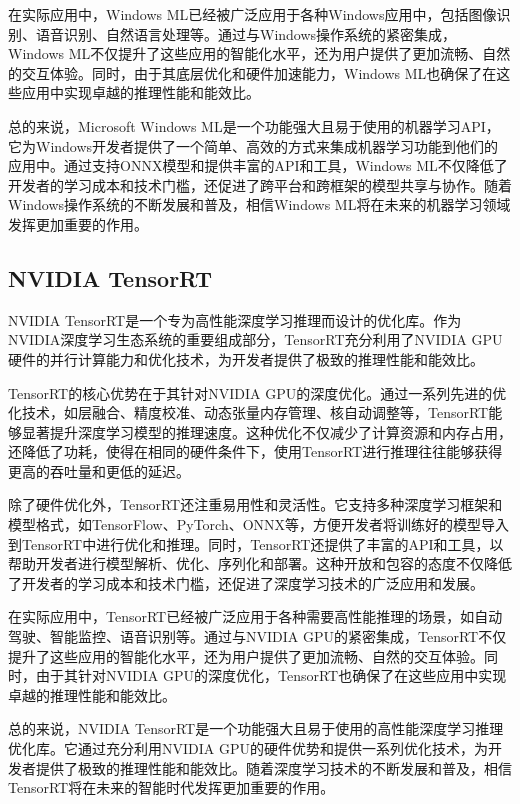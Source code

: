 在实际应用中，Windows ML已经被广泛应用于各种Windows应用中，包括图像识别、语音识别、自然语言处理等。通过与Windows操作系统的紧密集成，Windows ML不仅提升了这些应用的智能化水平，还为用户提供了更加流畅、自然的交互体验。同时，由于其底层优化和硬件加速能力，Windows ML也确保了在这些应用中实现卓越的推理性能和能效比。

总的来说，Microsoft Windows ML是一个功能强大且易于使用的机器学习API，它为Windows开发者提供了一个简单、高效的方式来集成机器学习功能到他们的应用中。通过支持ONNX模型和提供丰富的API和工具，Windows ML不仅降低了开发者的学习成本和技术门槛，还促进了跨平台和跨框架的模型共享与协作。随着Windows操作系统的不断发展和普及，相信Windows ML将在未来的机器学习领域发挥更加重要的作用。

\subsection{NVIDIA TensorRT}

NVIDIA TensorRT是一个专为高性能深度学习推理而设计的优化库。作为NVIDIA深度学习生态系统的重要组成部分，TensorRT充分利用了NVIDIA GPU硬件的并行计算能力和优化技术，为开发者提供了极致的推理性能和能效比。

TensorRT的核心优势在于其针对NVIDIA GPU的深度优化。通过一系列先进的优化技术，如层融合、精度校准、动态张量内存管理、核自动调整等，TensorRT能够显著提升深度学习模型的推理速度。这种优化不仅减少了计算资源和内存占用，还降低了功耗，使得在相同的硬件条件下，使用TensorRT进行推理往往能够获得更高的吞吐量和更低的延迟。

除了硬件优化外，TensorRT还注重易用性和灵活性。它支持多种深度学习框架和模型格式，如TensorFlow、PyTorch、ONNX等，方便开发者将训练好的模型导入到TensorRT中进行优化和推理。同时，TensorRT还提供了丰富的API和工具，以帮助开发者进行模型解析、优化、序列化和部署。这种开放和包容的态度不仅降低了开发者的学习成本和技术门槛，还促进了深度学习技术的广泛应用和发展。

在实际应用中，TensorRT已经被广泛应用于各种需要高性能推理的场景，如自动驾驶、智能监控、语音识别等。通过与NVIDIA GPU的紧密集成，TensorRT不仅提升了这些应用的智能化水平，还为用户提供了更加流畅、自然的交互体验。同时，由于其针对NVIDIA GPU的深度优化，TensorRT也确保了在这些应用中实现卓越的推理性能和能效比。

总的来说，NVIDIA TensorRT是一个功能强大且易于使用的高性能深度学习推理优化库。它通过充分利用NVIDIA GPU的硬件优势和提供一系列优化技术，为开发者提供了极致的推理性能和能效比。随着深度学习技术的不断发展和普及，相信TensorRT将在未来的智能时代发挥更加重要的作用。

